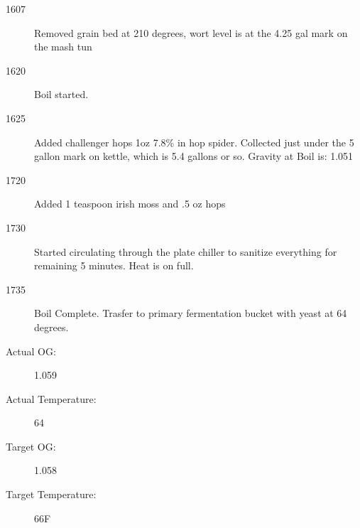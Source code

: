 \begin{description}
    \item[1607] Removed grain bed at 210 degrees, wort level is at the 4.25 gal mark on the mash tun
    \item[1620] Boil started.
    \item[1625] Added challenger hops 1oz 7.8\% in hop spider.  Collected just under the 5 gallon mark on kettle, which is 5.4 gallons or so.  Gravity at Boil is: 1.051
    \item[1720] Added 1 teaspoon irish moss and .5 oz hops
    \item[1730] Started circulating through the plate chiller to sanitize everything for remaining 5 minutes.  Heat is on full.
    \item[1735] Boil Complete.  Trasfer to primary fermentation bucket with yeast at 64 degrees.

    \item[Actual OG:] 1.059
    \item[Actual Temperature:] 64
    \item[Target OG:] 1.058
    \item[Target Temperature:] 66F
\end{description}
